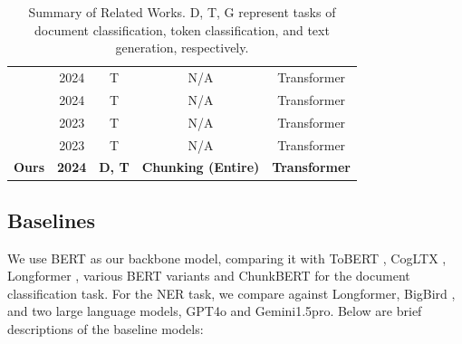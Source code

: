 \documentclass[11pt]{article}
\begin{document}
\begin{table}[!ht]
\begin{tabular}{l|cccc}
        \citep{dagdelen2024structured} & 2024 & T & N/A & Transformer  \\ 
        \citep{hu2024improving} & 2024 & T & N/A & Transformer  \\ 
        \citep{yu2023grounded} & 2023 & T & N/A & Transformer  \\ 
        \citep{zhang2023reducing} & 2023 & T & N/A & Transformer  \\ 
        \hline
        \textbf{Ours} & \textbf{2024} & \textbf{D, T} & \textbf{Chunking (Entire)} & \textbf{Transformer} \\ \hline
    \end{tabular}
    \caption{Summary of Related Works. D, T, G represent tasks of document classification, token classification, and text generation, respectively. }
    \label{tab:related_work}
\end{table}


\subsection{Baselines}
\label{app:baseline models}

We use BERT \citep{kenton2019bert} as our backbone model, comparing it with ToBERT \citep{pappagari2019hierarchical}, CogLTX \citep{ding2020cogltx}, Longformer \citep{beltagy2020longformer}, various BERT variants \citep{park2022efficient} and ChunkBERT \citep{jaiswal2023breaking} for the document classification task. For the NER task, we compare against Longformer, BigBird \citep{zaheer2020big}, and two large language models, GPT4o and Gemini1.5pro. Below are brief descriptions of the baseline models:
\end{document}
